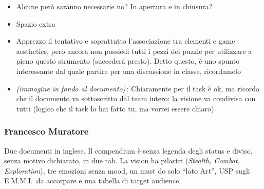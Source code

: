 {\begin{itemize}
  \item {} Alcune però saranno necessarie no? In apertura e in chiusura?
  \item \rvVuoto Spazio extra
  \item {} Apprezzo il tentativo e soprattutto l'associazione tra elementi e game aesthetics, però ancora non possiedi tutti i pezzi del puzzle per utilizzare a pieno questo strumento (succederà presto). Detto questo, è uno spunto interessante dal quale partire per una discussione in classe, ricordamelo
  \item \emph{(immagine in fondo al documento)}\,: Chiaramente per il task è ok, ma ricorda che il documento va sottoscritto dal team intero: la visione va condivisa con tutti (logico che il task lo hai fatto tu, ma vorrei essere chiaro)
\end{itemize}
}

\subsubsection{Francesco Muratore}
Due documenti in inglese. Il compendium è senza legenda degli status e diviso, senza motivo dichiarato, in due tab. La vision ha pilastri (\emph{Stealth, Combat, Exploration}), tre emozioni senza mood, un must do solo ``lato Art'', USP sugli E.M.M.I.\ da accorpare e una tabella di target audience.
